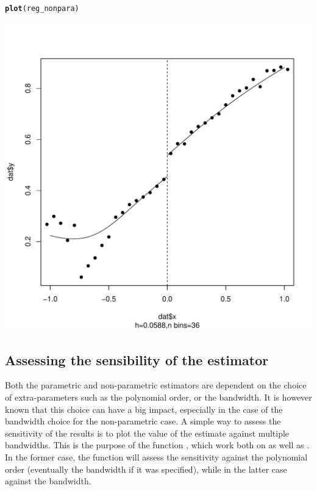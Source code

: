 \documentclass[english,nojss]{jss}\usepackage{graphicx, color}
\makeatletter
\def\maxwidth{ %
  \ifdim\Gin@nat@width>\linewidth
    \linewidth
  \else
    \Gin@nat@width
  \fi
}
\newcommand{\hlfunctioncall}[1]{\textcolor[rgb]{0.501960784313725,0,0.329411764705882}{\textbf{#1}}}%
\newenvironment{kframe}{%
 \def\at@end@of@kframe{}%
 \ifinner\ifhmode%
  \def\at@end@of@kframe{\end{minipage}}%
  \begin{minipage}{\columnwidth}%
 \fi\fi%
 \def\FrameCommand##1{\hskip\@totalleftmargin \hskip-\fboxsep
 \colorbox{shadecolor}{##1}\hskip-\fboxsep
     \hskip-\linewidth \hskip-\@totalleftmargin \hskip\columnwidth}%
 \MakeFramed {\advance\hsize-\width
   \@totalleftmargin\z@ \linewidth\hsize
   \@setminipage}}%
 {\par\unskip\endMakeFramed%
 \at@end@of@kframe}
\newenvironment{knitrout}{}{} %
\makeatother
\begin{document}
\begin{knitrout}
\color{fgcolor}\begin{kframe}
\begin{alltt}
\hlfunctioncall{plot}(reg_nonpara)
\end{alltt}
\end{kframe}
\includegraphics[width=\maxwidth]{figure/unnamed-chunk-12} 

\end{knitrout}



\subsection{Assessing the sensibility of the estimator}

Both the parametric and non-parametric estimators are dependent on
the choice of extra-parameters such as the polynomial order, or the
bandwidth. It is however known that this choice can have a big impact,
especially in the case of the bandwidth choice for the non-parametric
case. A simple way to assess the sensitivity of the results is to
plot the value of the estimate against multiple bandwidths. This is
the purpose of the function , which work both on
 as well as . In the former
case, the function will assess the sensitivity against the polynomial
order (eventually the bandwidth if it was specified), while in the
latter case against the bandwidth. 
\end{document}
